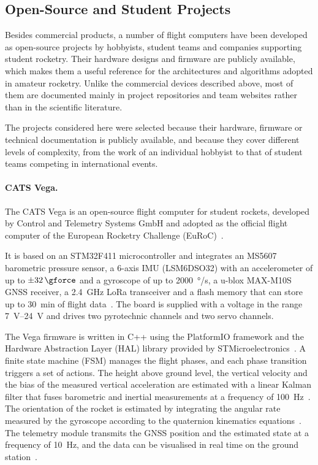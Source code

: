 \subsection{Open-Source and Student Projects}

Besides commercial products, a number of flight computers have been developed as open-source projects by hobbyists, student teams and companies supporting student rocketry. Their hardware designs and firmware are publicly available, which makes them a useful reference for the architectures and algorithms adopted in amateur rocketry. Unlike the commercial devices described above, most of them are documented mainly in project repositories and team websites rather than in the scientific literature.

The projects considered here were selected because their hardware, firmware or technical documentation is publicly available, and because they cover different levels of complexity, from the work of an individual hobbyist to that of student teams competing in international events. 

\paragraph{CATS Vega.} The CATS Vega is an open-source flight computer for student rockets, developed by Control and Telemetry Systems GmbH and adopted as the official flight computer of the European Rocketry Challenge (EuRoC)~\cite{cats}.

It is based on an STM32F411 microcontroller and integrates an MS5607 barometric pressure sensor, a 6-axis IMU (LSM6DSO32) with an accelerometer of up to $\pm\SI{32}{\gforce}$ and a gyroscope of up to \SI{2000}{\degree/\second}, a u-blox MAX-M10S GNSS receiver, a \SI{2.4}{GHz} LoRa transceiver and a flash memory that can store up to \SI{30}{min} of flight data~\cite{cats:vega}. The board is supplied with a voltage in the range \SIrange{7}{24}{V} and drives two pyrotechnic channels and two servo channels.

The Vega firmware is written in C++ using the PlatformIO framework and the Hardware Abstraction Layer (HAL) library provided by STMicroelectronics~\cite{cats:vegarepo}. A finite state machine (FSM) manages the flight phases, and each phase transition triggers a set of actions. The height above ground level, the vertical velocity and the bias of the measured vertical acceleration are estimated with a linear Kalman filter that fuses barometric and inertial measurements at a frequency of \SI{100}{Hz}~\cite{cats:vegaarticle}. The orientation of the rocket is estimated by integrating the angular rate measured by the gyroscope according to the quaternion kinematics equations~\cite{cats:vegarepo}. The telemetry module transmits the GNSS position and the estimated state at a frequency of \SI{10}{Hz}, and the data can be visualised in real time on the ground station~\cite{cats:vegaarticle}.

